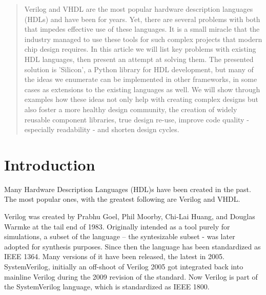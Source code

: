\documentclass[conference,compsoc]{IEEEtran}
\begin{document}
\begin{abstract}
Verilog and VHDL are the most popular hardware description languages (HDLs) and have been for years.
Yet, there are several problems with both that impedes effective use of these languages. It is a small
miracle that the industry managed to use these tools for such complex projects that modern chip design
requires. In this article we will list key problems with existing HDL languages, then present an
attempt at solving them. The presented solution is 'Silicon', a Python library for HDL development,
but many of the ideas we enumerate can be implemented in other frameworks, in some cases as extensions
to the existing languages as well. We will show through examples how these ideas not only help with
creating complex designs but also foster a more healthy design community, the creation
of widely reusable component libraries, true design re-use, improve code quality - especially
readability - and shorten design cycles.
\end{abstract}





%
\IEEEpeerreviewmaketitle



\section{Introduction}
Many Hardware Description Languages (HDL)s have been created in the past. The most popular ones,
with the greatest following are Verilog and VHDL.

Verilog was created by Prabhu Goel, Phil Moorby, Chi-Lai Huang, and Douglas Warmke at the tail
end of 1983. Originally intended as a tool purely for simulations, a subset of the language –
the syntesizable subset - was later adopted for synthesis purposes. Since then the language
has been standardized as IEEE 1364. Many versions of it have been released, the latest in 2005.
SystemVerilog, initially an off-shoot of Verilog 2005 got integrated back into mainline Verilog
during the 2009 revision of the standard. Now Verilog is part of the SystemVerilog language,
which is standardized as IEEE 1800.
\end{document}
